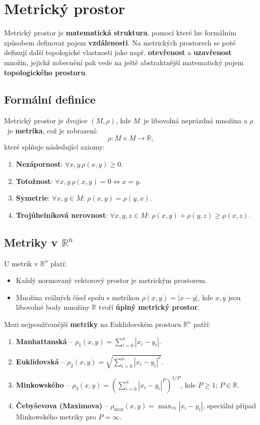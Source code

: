 \section{Metrický prostor}
Metrický prostor je \textbf{matematická struktura}, pomocí které lze formálním způsobem definovat pojem \textbf{vzdálenosti}. Na metrických prostorech se poté definují další topologické vlastnosti jako např. \textbf{otevřenost} a \textbf{uzavřenost} množin, jejichž zobecnění pak vede na ještě abstraktnější matematický pojem \textbf{topologického prostoru}.

\subsection{Formální definice}
Metrický prostor je dvojice $(M, \rho)$, kde $M$ je libovolná neprázdná množina a $\rho$ je \textbf{metrika}, což je zobrazení:
\begin{equation*}
    \rho: M \times M \rightarrow \mathbb{R},
\end{equation*}
které splňuje následující axiomy:
\begin{enumerate}
    \item \textbf{Nezápornost}: $\forall x, y \, \rho(x, y) \geq 0$.
    \item \textbf{Totožnost}: $\forall x, y \, \rho (x, y)  = 0 \Leftrightarrow x = y$.
    \item \textbf{Symetrie}: $\forall x, y \in M: \, \rho(x, y) = \rho(y,x)$.
    \item \textbf{Trojúhelníková nerovnost}: $\forall x, y, z \in M: \, \rho(x, y) + \rho(y,z) \geq \rho(x, z)$.
\end{enumerate}

\subsection{Metriky v $\mathbb{R}^n$}
U metrik v $\mathbb{R}^n$ platí:
\begin{itemize}
    \item Každý normovaný vektorový prostor je metrickým prostorem.
    \item Množina reálných čísel spolu s metrikou $\rho(x, y) = |x - y|$, kde $x, y$ jsou libovolné body množiny $\mathbb{R}$ tvoří \textbf{úplný metrický prostor}.
\end{itemize}
Mezi nejpoužívanější \textbf{metriky} na Euklidovském prostoru $\mathbb{R}^n$ patří:
\begin{enumerate}
    \item \textbf{Manhattanská} -- $\rho_1(x, y) = \sum_{i = 0}^n |x_i - y_i|$.
    \item \textbf{Euklidovská} -- $\rho_2(x, y) = \sqrt{\sum_{i = 0}^n |x_i - y_i|^2}$.
    \item \textbf{Minkowského} -- $\rho_3(x, y) = (\sum_{i = 0}^n |x_i - y_i|^P)^{1/P}$, kde $P \geq 1; \, P \in \mathbb{R}$.
    \item \textbf{Čebyševova (Maximova)} -- $\rho_{\max}(x, y) = \max_{\forall i} |x_i - y_i|$, speciální případ Minkowského metriky pro $P = \infty$.
\end{enumerate}

